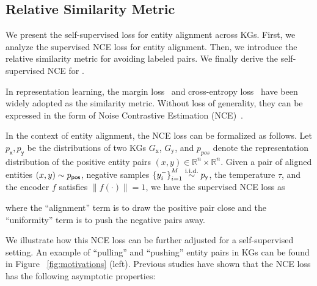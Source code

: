  
\subsection{Relative Similarity Metric}
\label{sec:rsm}

We present the self-supervised loss for entity alignment across KGs. 
First, we analyze the supervised NCE loss for entity alignment. 
Then, we introduce the relative similarity metric for avoiding labeled  pairs. 
We finally derive the self-supervised NCE for \solution. 

In representation learning, the margin loss~\cite{bordes2013translating,tang2019bert-int} and cross-entropy loss~\cite{zhang2019oag} have been widely adopted as the similarity metric. 
Without loss of generality, they can be expressed in the form of Noise Contrastive Estimation (NCE)~\cite{gutmann2010noise}. 

In the context of entity alignment, the NCE loss can be formalized as follows. 
Let $p_{\mathsf x}, p_{\mathsf y}$ be the distributions of two KGs $G_\mathrm{x}$, $G_\mathrm{y}$, and $p_{pos}$ denote the representation distribution of the positive entity pairs $(x,y)\in\mathbb{R}^n\times\mathbb{R}^n$.
Given a pair of aligned entities $(x, y) \sim p_\mathsf{pos}$, negative samples ${\{y^-_i\}}_{i=1}^M \overset{\text{i.i.d.}}{\sim} p_{\mathsf y}$, the temperature $\tau$, and the encoder $f$ satisfies $\|f(\cdot)\|=1$, we have the supervised NCE loss as  

\vspace{-0.2cm}
\noindent where the ``alignment'' term is to draw the positive pair close and the ``uniformity'' term is to push the negative pairs away. 

We illustrate how this NCE loss can be further adjusted for a self-supervised setting. 
An example of ``pulling'' and ``pushing'' entity pairs in KGs can be found in Figure ~\ref{fig:motivations} (left). 
Previous studies have shown that the NCE loss has the following asymptotic properties: 

